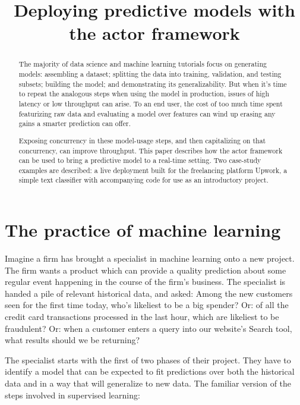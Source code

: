\documentclass[tablecaption=bottom,wcp]{jmlr}
\begin{document}
\title{Deploying predictive models with the actor framework}
\author{
}

\maketitle

\begin{abstract}
 The majority of data science and machine learning tutorials focus on generating
models: assembling a dataset; splitting the data into training, validation, and
testing subsets; building the model; and demonstrating its generalizability. But
when it's time to repeat the analogous steps when using the model in production,
issues of high latency or low throughput can arise. To an end user, the cost of
too much time spent featurizing raw data and evaluating a model over features
can wind up erasing any gains a smarter prediction can offer.

 Exposing concurrency in these model-usage steps, and then capitalizing on that
concurrency, can improve throughput. This paper describes how the actor
framework can be used to bring a predictive model to a real-time setting. Two
case-study examples are described: a live deployment built for the freelancing 
platform Upwork, a simple text classifier with accompanying code for use as an
introductory project.
\end{abstract}

\section{The practice of machine learning}

 Imagine a firm has brought a specialist in machine learning onto a new project.
The firm wants a product which can provide a quality prediction about some
regular event happening in the course of the firm's business. The specialist is
handed a pile of relevant historical data, and asked: Among the new customers
seen for the first time today, who's likeliest to be a big spender? Or: of all
the credit card transactions processed in the last hour, which are likeliest to
be fraudulent? Or: when a customer enters a query into our website's Search
tool, what results should we be returning?

 The specialist starts with the first of two phases of their project. They have
to identify a model that can be expected to fit predictions over both the
historical data and in a way that will generalize to new data. The familiar
version of the steps involved in supervised learning:
\end{document}
